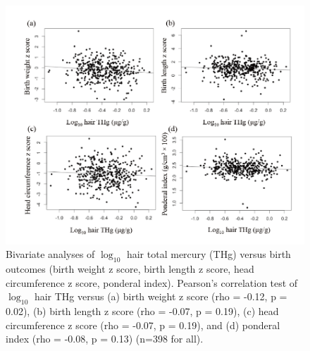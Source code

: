 \begin{figure}
  \centering
    \label{fig:Fig314}
  \includegraphics[scale=1]{Figures/Fig314.pdf}
  \caption[Bivariate analyses of $\log_{10}$ hair total mercury versus birth outcomes (birth weight z score, birth length z score, head circumference z score, ponderal index)]{Bivariate analyses of $\log_{10}$ hair total mercury (THg) versus birth outcomes (birth weight z score, birth length z score, head circumference z score, ponderal index). Pearson's correlation test of $\log_{10}$ hair THg versus (a) birth weight z score (rho = -0.12, p = 0.02), (b) birth length z score (rho = -0.07, p = 0.19), (c) head circumference z score (rho = -0.07, p = 0.19), and (d) ponderal index (rho = -0.08, p = 0.13) (n=398 for all).}
\end{figure}


